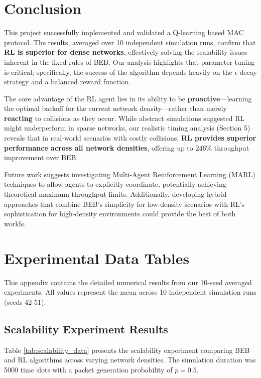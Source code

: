 \documentclass[12pt,a4paper,oneside]{article}
\theoremstyle{definition}
\begin{document}
\section{Conclusion}

This project successfully implemented and validated a Q-learning based MAC protocol. The results, averaged over 10 independent simulation runs, confirm that \textbf{RL is superior for dense networks}, effectively solving the scalability issues inherent in the fixed rules of BEB. Our analysis highlights that parameter tuning is critical; specifically, the success of the algorithm depends heavily on the $\epsilon$-decay strategy and a balanced reward function.

The core advantage of the RL agent lies in its ability to be \textbf{proactive}—learning the optimal backoff for the current network density—rather than merely \textbf{reacting} to collisions as they occur. While abstract simulations suggested RL might underperform in sparse networks, our realistic timing analysis (Section 5) reveals that in real-world scenarios with costly collisions, \textbf{RL provides superior performance across all network densities}, offering up to 246\% throughput improvement over BEB.

Future work suggests investigating Multi-Agent Reinforcement Learning (MARL) techniques to allow agents to explicitly coordinate, potentially achieving theoretical maximum throughput limits. Additionally, developing hybrid approaches that combine BEB's simplicity for low-density scenarios with RL's sophistication for high-density environments could provide the best of both worlds.

\clearpage
\appendix

\section{Experimental Data Tables}

This appendix contains the detailed numerical results from our 10-seed averaged experiments. All values represent the mean across 10 independent simulation runs (seeds 42-51).

\subsection{Scalability Experiment Results}

Table \ref{tab:scalability_data} presents the scalability experiment comparing BEB and RL algorithms across varying network densities. The simulation duration was 5000 time slots with a packet generation probability of $p=0.5$.
\end{document}
